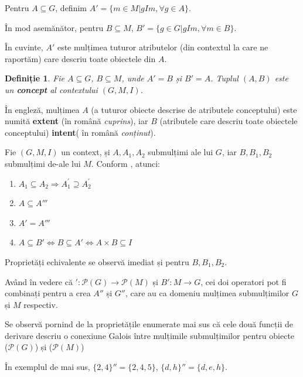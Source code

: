 \documentclass[12pt, a4paper, twoside, romanian]{teza-upb}
\newtheorem{defn}{Definiție}
\begin{document}
    Pentru $A \subseteq G$, definim
    $ A' = \{m \in M | gIm, \forall g \in A\} $.

    În mod asemănător, pentru $B \subseteq M$, $B' = \{g \in G | gIm, \forall m \in B \}$.

    În cuvinte, $A'$ este mulțimea tuturor atributelor (din contextul la care ne raportăm) care descriu toate obiectele din $A$.

    \begin{defn}
      Fie $A \subseteq G$, $B \subseteq M$, unde $A' = B$ și $B' = A$. Tuplul $(A, B)$ este un \textbf{concept} al contextului $(G, M, I)$.
    \end{defn}

    În engleză, mulțimea $A$ (a tuturor obiecte descrise de atributele conceptului) este numită \textbf{extent} (în română \textit{cuprins}), iar $B$ (atributele care descriu toate obiectele conceptului) \textbf{intent}( în română \textit{conținut}).


Fie $(G, M, I)$ un context, și $A, A_1, A_2$ submulțimi ale lui $G$, iar $B, B_1, B_2$ submulțimi de-ale lui $M$. Conform \cite{Ganter:1997:FCA:550737}, atunci:

    \begin{enumerate}
        \item $A_1 \subseteq A_2 \Rightarrow A^{'}_{1} \supseteq A^{'}_2$
        \item $A  \subseteq A'''$
        \item $A' = A'''$
        \item $A \subseteq B' \Longleftrightarrow B \subseteq A' \Longleftrightarrow A \times B \subseteq I$
    \end{enumerate}

    Proprietăți echivalente se observă imediat și pentru $B, B_1, B_2$.

    Având în vedere că $ ': \mathcal P \left(G \right) \rightarrow \mathcal P \left(M\right)$ și $B' : M \rightarrow G$, cei doi operatori pot fi combinați pentru a crea $A''$ și $G''$, care au ca domeniu mulțimea submulțimilor $G$ și $M$ respectiv. 

Se observă pornind de la proprietățile enumerate mai sus că cele două funcții de derivare descriu o conexiune Galois între mulțimile submulțimilor pentru obiecte ($\mathcal P \left(G \right)$) și ($\mathcal P \left( M \right) $)

În exemplul de mai sus, $\{2, 4\}'' = \{2, 4, 5\}$, $\{d, h\}'' = \{d, e, h \}$.
\end{document}
